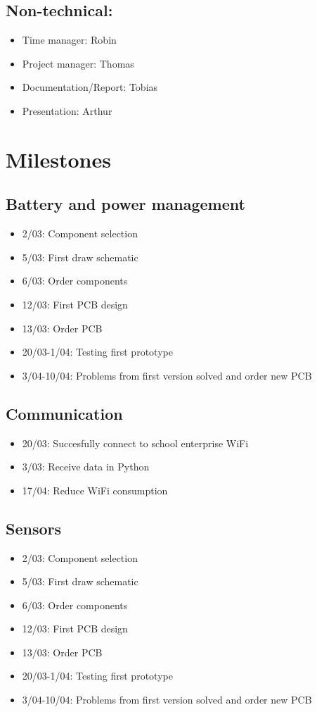 \documentclass[11pt,a4paper]{article}
\begin{document}
	\subsection{Non-technical: }
	\begin{itemize}
		\item Time manager: Robin
		\item Project manager: Thomas
		\item Documentation/Report: Tobias
		\item Presentation: Arthur
	\end{itemize}

	\section{Milestones}
	\subsection{Battery and power management}
	\begin{itemize}
		\item 2/03: Component selection
		\item 5/03: First draw schematic
		\item 6/03: Order components
		\item 12/03: First PCB design
		\item 13/03: Order PCB
		\item 20/03-1/04: Testing first prototype
		\item 3/04-10/04: Problems from first version solved and order new PCB 
	\end{itemize}

	\subsection{Communication}
	\begin{itemize}
		\item 20/03: Succesfully connect to school enterprise WiFi
		\item 3/03: Receive data in Python
		\item 17/04: Reduce WiFi consumption
	\end{itemize}

	\subsection{Sensors}
	\begin{itemize}
		\item 2/03: Component selection
		\item 5/03: First draw schematic
		\item 6/03: Order components
		\item 12/03: First PCB design
		\item 13/03: Order PCB
		\item 20/03-1/04: Testing first prototype
		\item 3/04-10/04: Problems from first version solved and order new PCB 
	\end{itemize}
\end{document}
